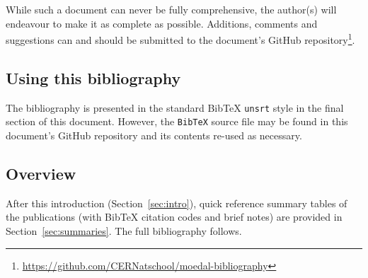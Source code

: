 While such a document can never be fully comprehensive,
the author(s) will endeavour to make it as complete as possible.
Additions, comments and suggestions can and should be submitted to
the document's GitHub repository\footnote{
\href{https://github.com/CERNatschool/moedal-bibliography}{https://github.com/CERNatschool/moedal-bibliography}
}.

\subsection{Using this bibliography}
\label{sec:using}
The bibliography is presented in the standard BibTeX \texttt{unsrt} style
in the final section of this document.
However, the \texttt{BibTeX} source file may be found
in this document's GitHub repository
and its contents re-used as necessary.

\subsection{Overview}
\label{sec:overview}
After this introduction (Section~\ref{sec:intro}),
quick reference summary tables of the publications
(with BibTeX citation codes and brief notes)
are provided in Section~\ref{sec:summaries}.
%
The full bibliography follows.
